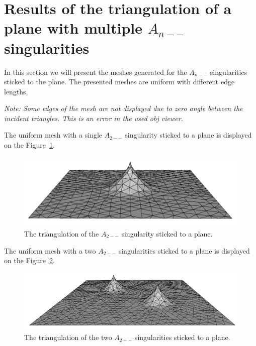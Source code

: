 \clearpage
\section{Results of the triangulation of a plane with multiple $A_{n--}$ singularities}
In this section we will present the meshes generated for the $A_{n--}$ singularities
sticked to the plane. The presented meshes are uniform with different edge lengths.

\textit{Note: Some edges of the mesh are not displayed due to zero angle between the incident
triangles. This is an error in the used obj viewer.}

The uniform mesh with a single $A_{2--}$ singularity sticked to a plane is displayed
on the Figure~\ref{img:84}.

\begin{figure}[h!]
    \centerline{\includegraphics[scale=0.5]{images/img84}}
    \caption[The triangulation of the $A_{2--}$ singularity sticked to a plane]
    {The triangulation of the $A_{2--}$ singularity sticked to a plane.}
    \label{img:84}
\end{figure}

The uniform mesh with a two $A_{2--}$ singularities sticked to a plane is displayed
on the Figure~\ref{img:85}.

\begin{figure}[h!]
    \centerline{\includegraphics[scale=0.5]{images/img85}}
    \caption[The triangulation of the two $A_{2--}$ singularities sticked to a plane]
    {The triangulation of the two $A_{2--}$ singularities sticked to a plane.}
    \label{img:85}
\end{figure}

